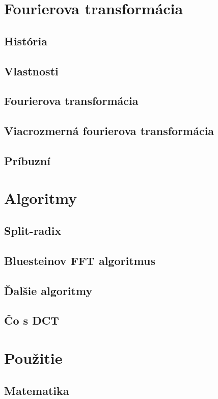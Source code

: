



\chapter{Fourierova transformácia}
\section{História}
    
\section{Vlastnosti}
\section{Fourierova transformácia}
\section{Viacrozmerná fourierova transformácia}
\section{Príbuzní}

\chapter{Algoritmy}
    
    
    \section{Split-radix}
    \section{Bluesteinov FFT algoritmus}
    \section{Ďalšie algoritmy}
    \section{Čo s DCT}


\chapter{Použitie}
\section{Matematika}
